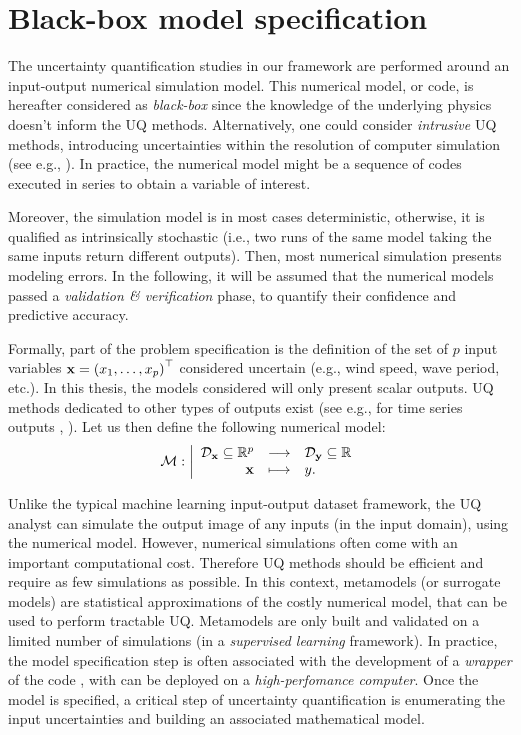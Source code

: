\section{Black-box model specification}
The uncertainty quantification studies in our framework are performed around an input-output numerical simulation model. 
This numerical model, or code, is hereafter considered as \textit{black-box} since the knowledge of the underlying physics doesn't inform the UQ methods. 
Alternatively, one could consider \textit{intrusive} UQ methods, introducing uncertainties within the resolution of computer simulation (see e.g., ).
In practice, the numerical model might be a sequence of codes executed in series to obtain a variable of interest.

Moreover, the simulation model is in most cases deterministic, otherwise, it is qualified as intrinsically stochastic (i.e., two runs of the same model taking the same inputs return different outputs).
Then, most numerical simulation presents modeling errors. 
In the following, it will be assumed that the numerical models passed a \textit{validation \& verification} phase, to quantify their confidence and predictive accuracy. 

Formally, part of the problem specification is the definition of the set of $p$ input variables ${\bf x} = \left(x_1, \dots, x_p\right)^\top$ considered uncertain (e.g., wind speed, wave period, etc.). 
In this thesis, the models considered will only present scalar outputs. 
UQ methods dedicated to other types of outputs exist (see e.g., for time series outputs \cite{lataniotis_2019}, ). 
Let us then define the following numerical model:
\begin{equation}
\mathcal{M} : \bigg|
    \begin{array}{rcl}
        \mathcal{D}_{{\bf x}} \subseteq \mathbb{R}^p & \longrightarrow & \mathcal{D}_{{\bf y}} \subseteq \mathbb{R} \\
        {\bf x} & \longmapsto & y.
    \end{array}
\end{equation}

Unlike the typical machine learning input-output dataset framework, the UQ analyst can simulate the output image of any inputs (in the input domain), using the numerical model. 
However, numerical simulations often come with an important computational cost. 
Therefore UQ methods should be efficient and require as few simulations as possible. 
In this context, metamodels (or surrogate models) are statistical approximations of the costly numerical model, that can be used to perform tractable UQ. 
Metamodels are only built and validated on a limited number of simulations (in a \textit{supervised learning} framework).
In practice, the model specification step is often associated with the development of a \textit{wrapper} of the code , with can be deployed on a \textit{high-perfomance computer}.
Once the model is specified, a critical step of uncertainty quantification is enumerating the input uncertainties and building an associated mathematical model.


